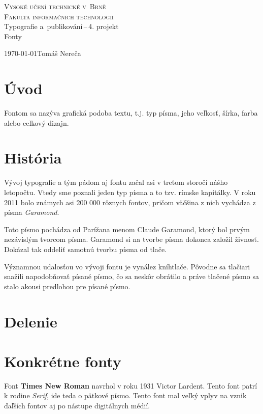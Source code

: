 \documentclass[a4paper, 11pt]{article}
\begin{document}
\begin{titlepage}
\begin{center}
\textsc{\Huge Vysoké učení technické v~Brně\\
		\huge Fakulta informačních technologií\\}
{\LARGE Typografie a~publikování\,--\,4. projekt\\}
\Huge Fonty\\
\end{center}
{\Large \today \hfill Tomáš Nereča}\vspace{-2em}
\end{titlepage}

\section{Úvod}
Fontom sa nazýva grafická podoba textu, t.j. typ písma, jeho veľkosť, šírka, farba alebo celkový dizajn. \cite{computerhope:font}

\section{História}
Vývoj typografie a tým pádom aj fontu začal asi v treťom storočí nášho letopočtu. Vtedy sme poznali jeden typ písma a to tzv. rímske kapitálky. 
V roku 2011 bolo známych asi 200 000 rôznych fontov, pričom väčšina z nich vychádza z písma \emph{Garamond}. \cite{felici:typography}

Toto písmo pochádza od Parížana menom Claude Garamond, ktorý bol prvým nezávislým tvorcom písma. Garamond si na tvorbe písma dokonca založil živnosť. Dokázal tak oddeliť samotnú tvorbu písma od tlače. \cite{uhlirova:typografie}

Významnou udalosťou vo vývoji fontu je vynález kníhtlače. Pôvodne sa tlačiari snažili napodobňovať písané písmo, čo sa neskôr obrátilo a práve tlačené písmo sa stalo akousi predlohou pre písané písmo. \cite{wikisofia:vyvoj_pisma}

\section{Delenie}

\section{Konkrétne fonty}
Font \textbf{Times New Roman} navrhol v roku 1931 Victor Lardent. Tento font patrí k rodine \emph{Serif}, ide teda o pätkové písmo. Tento font mal veľký vplyv na vznik ďaľších fontov aj po nástupe digitálnych médií. \cite{typedia:times}
\end{document}
